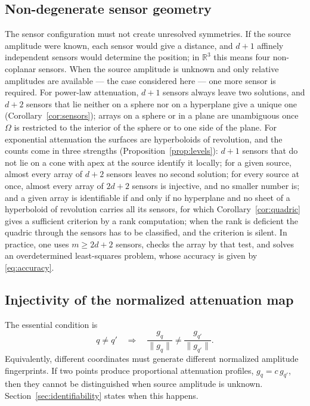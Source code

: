 \documentclass{article}
\begin{document}
\subsection{Non-degenerate sensor geometry}\label{sec:non-degenerate-sensor-geometry}

The sensor configuration must not create unresolved symmetries. If the source amplitude were known, each sensor would give a distance, and $d + 1$ affinely independent sensors would determine the position; in $\mathbb{R}^{3}$ this means four non-coplanar sensors. When the source amplitude is unknown and only relative amplitudes are available --- the case considered here --- one more sensor is required. For power-law attenuation, $d + 1$ sensors always leave two solutions, and $d + 2$ sensors that lie neither on a sphere nor on a hyperplane give a unique one (Corollary~\ref{cor:sensors}); arrays on a sphere or in a plane are unambiguous once $\Omega$ is restricted to the interior of the sphere or to one side of the plane. For exponential attenuation the surfaces are hyperboloids of revolution, and the counts come in three strengths (Proposition~\ref{prop:levels}): $d + 1$ sensors that do not lie on a cone with apex at the source identify it locally; for a given source, almost every array of $d + 2$ sensors leaves no second solution; for every source at once, almost every array of $2d + 2$ sensors is injective, and no smaller number is; and a given array is identifiable if and only if no hyperplane and no sheet of a hyperboloid of revolution carries all its sensors, for which Corollary~\ref{cor:quadric} gives a sufficient criterion by a rank computation; when the rank is deficient the quadric through the sensors has to be classified, and the criterion is silent. In practice, one uses $m \ge 2d + 2$ sensors, checks the array by that test, and solves an overdetermined least-squares problem, whose accuracy is given by \eqref{eq:accuracy}.

\subsection{Injectivity of the normalized attenuation map}\label{sec:injectivity-of-the-normalized}

The essential condition is \[
q \neq q' \quad \Longrightarrow \quad \frac{g_q}{\lVert g_q \rVert} \neq \frac{g_{q'}}{\lVert g_{q'} \rVert}.
\] Equivalently, different coordinates must generate different normalized amplitude fingerprints. If two points produce proportional attenuation profiles, $g_q = c\, g_{q'}$, then they cannot be distinguished when source amplitude is unknown. Section~\ref{sec:identifiability} states when this happens.
\end{document}
